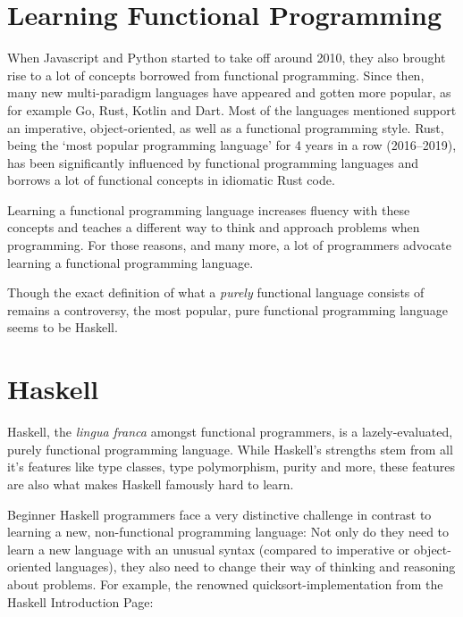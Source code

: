 
\section{Learning Functional Programming}
When Javascript and Python started to take off around 2010\autocite{python-popularity},
they also brought rise to a lot of concepts borrowed from functional programming.
Since then, many new multi-paradigm
languages have appeared and gotten more popular, as for example Go, Rust,
Kotlin and Dart.
Most of the languages mentioned support an imperative, object-oriented, as well as a functional programming style.
Rust, being the `most popular programming language'\autocite{rust-loved} for 4 years in a row (2016--2019), has been
significantly influenced by functional programming languages\autocite{rust-functional} and borrows a lot of functional
concepts in idiomatic Rust code.

Learning a functional programming language increases fluency with these concepts and teaches a different
way to think and approach problems when programming. For those reasons, and many more, a lot of programmers
advocate learning a functional programming language.

Though the exact definition of what a \textit{purely} functional language consists of remains a controversy\autocite{functional-controversy},
the most popular, pure functional programming language seems to be Haskell\autocite{comparison-functional-languages}.

\section{Haskell}

Haskell, the \textit{lingua franca} amongst functional programmers, is a lazely-evaluated, purely functional programming
language. While Haskell's strengths stem from all it's features like type classes, type polymorphism, purity and more,
these features are also what makes Haskell famously hard to learn\autocite{haskell-hard-one}\autocite{haskell-hard-two}\autocite{haskell-hard-three}\autocite{haskell-hard-four}.

Beginner Haskell programmers face a very distinctive challenge in contrast to learning a new, non-functional programming language:
Not only do they need to learn a new language with an unusual syntax (compared to imperative or object-oriented languages), they
also need to change their way of thinking and reasoning about problems.
For example, the renowned quicksort-implementation from the Haskell Introduction Page\autocite{haskell-quicksort}:

